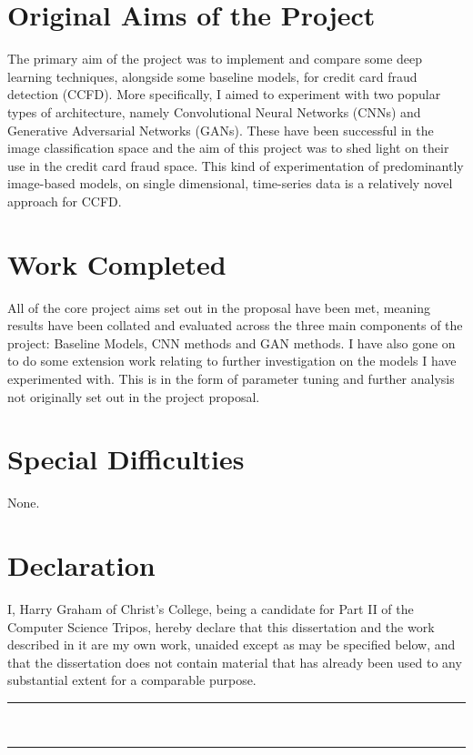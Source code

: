 \documentclass[12pt,a4paper,twoside]{report}
\begin{document}
\section*{Original Aims of the Project}
The primary aim of the project was to implement and compare some deep learning techniques, alongside some baseline models, for credit card fraud detection (CCFD). More specifically, I aimed to experiment with two popular types of architecture, namely Convolutional Neural Networks (CNNs)  \cite{DBLP:journals/corr/SimonyanZ14a} and Generative Adversarial Networks (GANs). These have been successful in the image classification space and the aim of this project was to shed light on their use in the credit card fraud space. This kind of experimentation of predominantly image-based models, on single dimensional, time-series data is a relatively novel approach for CCFD.

\section*{Work Completed}
All of the core project aims set out in the proposal have been met, meaning results have been collated and evaluated across the three main components of the project: Baseline Models, CNN methods and GAN methods. 
I have also gone on to do some extension work relating to further investigation on the models I have experimented with. This is in the form of parameter tuning and further analysis not originally set out in the project proposal.

\section*{Special Difficulties}
None.


\newpage

\section*{Declaration}

I, Harry Graham of Christ's College, being a candidate for Part II of the Computer Science Tripos, hereby declare that this dissertation and the work described in it are my own work, unaided except as may be specified below, and that the dissertation does not contain material that has already been used to any substantial extent for a comparable purpose.

\vspace{1cm}
\begin{multicols}{2}

\rule{5cm}{0.15mm} \\

\columnbreak

\rule{5cm}{0.15mm} \\

\end{multicols}
\end{document}
